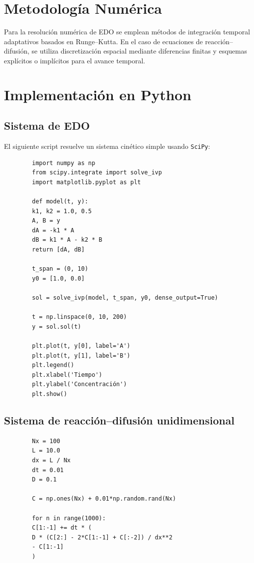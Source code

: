 \documentclass[12pt,letterpaper]{article}
\begin{document}
	\section{Metodología Numérica}
	Para la resolución numérica de EDO se emplean métodos de integración temporal adaptativos basados en Runge--Kutta. En el caso de ecuaciones de reacción--difusión, se utiliza discretización espacial mediante diferencias finitas y esquemas explícitos o implícitos para el avance temporal.
	
	\section{Implementación en Python}
	
	\subsection{Sistema de EDO}
	El siguiente script resuelve un sistema cinético simple usando \texttt{SciPy}:
	
	\begin{lstlisting}
		import numpy as np
		from scipy.integrate import solve_ivp
		import matplotlib.pyplot as plt
		
		def model(t, y):
		k1, k2 = 1.0, 0.5
		A, B = y
		dA = -k1 * A
		dB = k1 * A - k2 * B
		return [dA, dB]
		
		t_span = (0, 10)
		y0 = [1.0, 0.0]
		
		sol = solve_ivp(model, t_span, y0, dense_output=True)
		
		t = np.linspace(0, 10, 200)
		y = sol.sol(t)
		
		plt.plot(t, y[0], label='A')
		plt.plot(t, y[1], label='B')
		plt.legend()
		plt.xlabel('Tiempo')
		plt.ylabel('Concentración')
		plt.show()
	\end{lstlisting}
	
	\subsection{Sistema de reacción--difusión unidimensional}
	\begin{lstlisting}
		Nx = 100
		L = 10.0
		dx = L / Nx
		dt = 0.01
		D = 0.1
		
		C = np.ones(Nx) + 0.01*np.random.rand(Nx)
		
		for n in range(1000):
		C[1:-1] += dt * (
		D * (C[2:] - 2*C[1:-1] + C[:-2]) / dx**2
		- C[1:-1]
		)
	\end{lstlisting}
	
\end{document}
